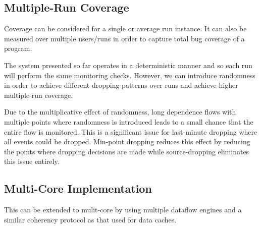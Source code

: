 \subsection{Multiple-Run Coverage}
Coverage can be considered for a single or average run instance. It can also be
measured over multiple users/runs in order to capture total bug coverage of a
program.

The system presented so far operates in a deterministic manner and so each run
will perform the same monitoring checks. However, we can introduce randomness
in order to achieve different dropping patterns over runs and achieve higher
multiple-run coverage.

Due to the multiplicative effect of randomness, long dependence flows with
multiple points where randomness is introduced leads to a small chance that the
entire flow is monitored. This is a significant issue for last-minute dropping
where all events could be dropped. Min-point dropping reduces this effect by
reducing the points where dropping decisions are made while source-dropping
eliminates this issue entirely.

\subsection{Multi-Core Implementation}

This can be extended to mulit-core by using multiple dataflow engines and a
similar coherency protocol as that used for data caches.
